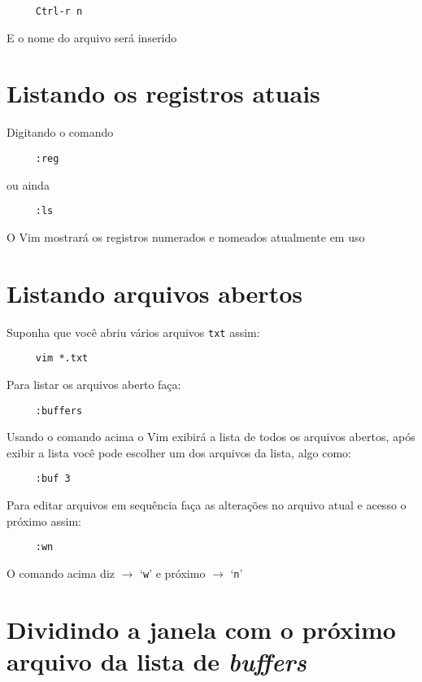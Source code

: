 \begin{verbatim}
     Ctrl-r n
\end{verbatim}

E o nome do arquivo será inserido

\section{Listando os registros atuais}
\label{Listando os registros atuais}
Digitando o comando

\begin{verbatim}
     :reg
\end{verbatim}

ou ainda

\begin{verbatim}
     :ls
\end{verbatim}

O Vim mostrará os registros numerados e nomeados atualmente em uso

\section{Listando arquivos abertos}
\label{Listando arquivos abertos}
Suponha que você abriu vários arquivos {\tt txt} assim:

\begin{verbatim}
     vim *.txt
\end{verbatim}

Para listar os arquivos aberto faça:

\begin{verbatim}
     :buffers
\end{verbatim}

Usando o comando acima o Vim exibirá a lista de todos os arquivos
abertos, após exibir a lista você pode escolher um dos arquivos da
lista, algo como:

\begin{verbatim}
     :buf 3
\end{verbatim}

Para editar arquivos em sequência faça as alterações no arquivo atual
e acesso o próximo assim:

\begin{verbatim}
     :wn
\end{verbatim}

O comando acima diz  $\rightarrow$ `{\tt w}'  e próximo  $\rightarrow$ `{\tt n}'

\section{Dividindo a janela com o próximo arquivo da lista de {\em buffers}}
\label{Dividindo a janela com o próximo arquivo da lista de buffers}

